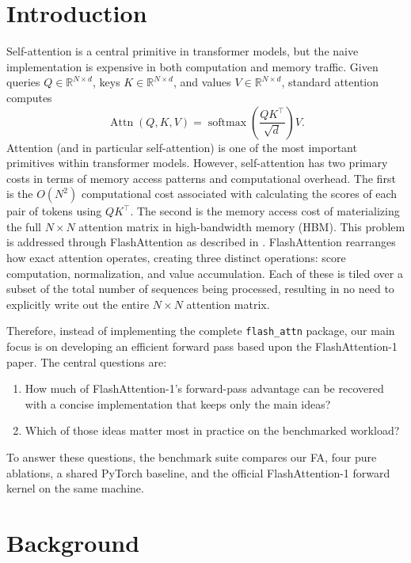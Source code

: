 \documentclass{article}
\begin{document}
\section{Introduction}
Self-attention is a central primitive in transformer models, but the naive implementation is expensive in both computation and memory traffic. Given queries $Q \in \mathbb{R}^{N \times d}$, keys $K \in \mathbb{R}^{N \times d}$, and values $V \in \mathbb{R}^{N \times d}$, standard attention computes
\begin{equation}
\operatorname{Attn}(Q,K,V) = \operatorname{softmax}\left(\frac{QK^\top}{\sqrt{d}}\right)V.
\end{equation}
Attention (and in particular self-attention) is one of the most important primitives within transformer models. However, self-attention has two primary costs in terms of memory access patterns and computational overhead. The first is the $O(N^2)$ computational cost associated with calculating the scores of each pair of tokens using $QK^\top$. The second is the memory access cost of materializing the full $N\times N$ attention matrix in high-bandwidth memory (HBM). This problem is addressed through FlashAttention as described in \citet{dao2022flashattention}. FlashAttention rearranges how exact attention operates, creating three distinct operations: score computation, normalization, and value accumulation. Each of these is tiled over a subset of the total number of sequences being processed, resulting in no need to explicitly write out the entire $N\times N$ attention matrix.

Therefore, instead of implementing the complete \texttt{flash\_attn} package, our main focus is on developing an efficient forward pass based upon the FlashAttention-1 paper. The central questions are:
\begin{enumerate}
    \item How much of FlashAttention-1's forward-pass advantage can be recovered with a concise implementation that keeps only the main ideas?
    \item Which of those ideas matter most in practice on the benchmarked workload?
\end{enumerate}
To answer these questions, the benchmark suite compares our FA, four pure ablations, a shared PyTorch baseline, and the official FlashAttention-1 forward kernel on the same machine.

\section{Background}
\end{document}
